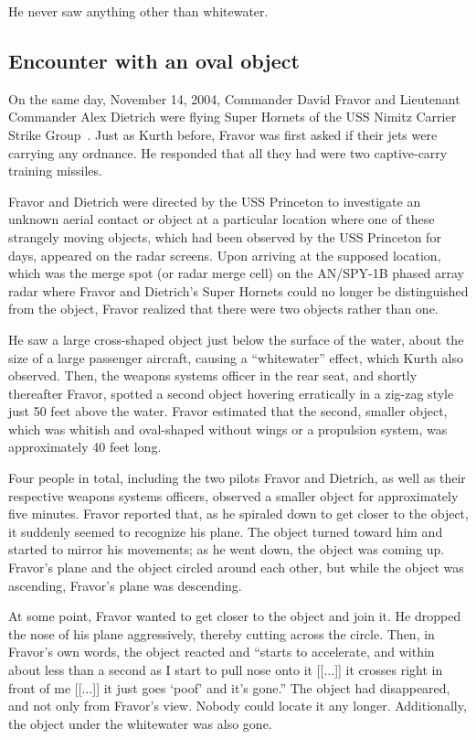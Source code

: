 He never saw anything other than whitewater.


\subsection{Encounter with an oval object}

On the same day, November 14, 2004, Commander David Fravor and Lieutenant Commander Alex Dietrich
were flying Super Hornets of the USS Nimitz Carrier Strike Group~\cite{Fravor_2023-HOC}.
Just as Kurth before,
Fravor was first asked if their jets were carrying any ordnance. He responded that all they had were two captive-carry training missiles.

Fravor and Dietrich were directed by the USS Princeton to investigate an unknown aerial contact or object at a particular location
where one of these strangely moving objects, which had been observed by the USS Princeton for days, appeared on the radar screens.
Upon arriving at the supposed location, which was the merge spot (or radar merge cell) on the AN/SPY-1B phased array radar where
Fravor and Dietrich's Super Hornets could no longer be distinguished from the object,
Fravor realized that there were two objects rather than one.

He saw a large cross-shaped object just below the surface of the water,
about the size of a large passenger aircraft, causing a ``whitewater'' effect, which Kurth also observed.
Then, the weapons systems officer in the rear seat, and shortly thereafter Fravor, spotted a second object hovering erratically in a zig-zag style just 50 feet above the water. Fravor estimated that the second, smaller object, which was whitish and
oval-shaped without wings or a propulsion system, was approximately 40 feet long.

Four people in total, including the two pilots Fravor and Dietrich, as well as their respective weapons systems officers,
observed a smaller object for approximately five minutes. Fravor reported that, as he spiraled down to get closer to the object,
it suddenly seemed to recognize his plane. The object turned toward him and started to mirror his movements; as he went down,
the object was coming up. Fravor's plane and the object circled around each other, but while the object was ascending, Fravor's plane was descending.

At some point, Fravor wanted to get closer to the object and join it.
He dropped the nose of his plane aggressively, thereby cutting across the circle.
Then, in Fravor's own words, the object reacted and ``starts to accelerate, and within about less than a second as
I start to pull nose onto it [[$\ldots$]] it crosses right in front of me [[$\ldots$]] it just goes `poof' and it's gone.''
The object had disappeared, and not only from Fravor's view. Nobody could locate it any longer.
Additionally, the object under the whitewater was also gone.

